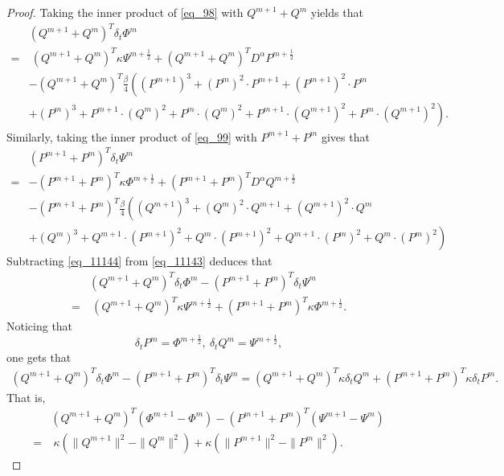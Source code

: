 \documentclass[preprint,compress,3p,10pt,fleqn]{elsarticle}
\numberwithin{equation}{section}
\begin{document}
\begin{proof}
Taking the inner product of \eqref{eq_98} with $Q^{m+1}+Q^{m}$ yields that
\begin{align}
&(Q^{m+1}+Q^{m})^{T}\delta_{t} \varPhi^{m}\nonumber\\
=&~(Q^{m+1}+Q^{m})^{T}\kappa \Psi^{m+\frac{1}{2}}+(Q^{m+1}+Q^{m})^{T}D^{\alpha} P^{m+\frac{1}{2}}\nonumber\\
&-(Q^{m+1}+Q^{m})^{T}\frac{\beta}{4}\left((P^{m+1})^3+(P^{m})^{2}\cdot P^{m+1}+(P^{m+1})^{2}\cdot P^{m}\right.\nonumber\\
&\left.+(P^{m})^{3}+P^{m+1}\cdot (Q^{m})^{2}+P^{m}\cdot (Q^{m})^{2}+P^{m+1}\cdot (Q^{m+1})^{2}+P^{m}\cdot (Q^{m+1})^{2}\right).\label{eq_11143}
\end{align}
Similarly, taking the inner product of \eqref{eq_99} with $P^{m+1}+P^{m}$ gives that
\begin{align}
&(P^{m+1}+P^{m})^{T}\delta_{t} \Psi^{m}\nonumber\\
=&-(P^{m+1}+P^{m})^{T}\kappa \varPhi^{m+\frac{1}{2}}+(P^{m+1}+P^{m})^{T}D^{\alpha} Q^{m+\frac{1}{2}}\nonumber\\
&-(P^{m+1}+P^{m})^{T}\frac{\beta}{4}\left((Q^{m+1})^3+(Q^{m})^{2}\cdot Q^{m+1}+(Q^{m+1})^{2}\cdot Q^{m}\right.\nonumber\\
&\left.+(Q^{m})^{3}+Q^{m+1}\cdot (P^{m+1})^{2}+Q^{m}\cdot (P^{m+1})^{2}+Q^{m+1}\cdot (P^{m})^{2}+Q^{m}\cdot (P^{m})^{2}\right)\label{eq_11144}
\end{align}
Subtracting \eqref{eq_11144} from \eqref{eq_11143} deduces that
\begin{align}
&(Q^{m+1}+Q^{m})^{T}\delta_{t} \varPhi^{m}-(P^{m+1}+P^{m})^{T}\delta_{t} \Psi^{m}\nonumber\\
=&~(Q^{m+1}+Q^{m})^{T}\kappa \Psi^{m+\frac{1}{2}}+(P^{m+1}+P^{m})^{T}\kappa \varPhi^{m+\frac{1}{2}}.\label{eq_11145}
\end{align}
Noticing that
$$\delta_t P^m=\varPhi^{m+\frac{1}{2}},~\delta_t Q^m=\Psi^{m+\frac{1}{2}},$$
one gets that
\begin{align}\label{eq_11146}
(Q^{m+1}+Q^{m})^{T}\delta_{t} \varPhi^{m}\!-\!(P^{m+1}+P^{m})^{T}\delta_{t} \Psi^{m}=(Q^{m+1}+Q^{m})^{T}\kappa \delta_t Q^m+(P^{m+1}+P^{m})^{T}\kappa \delta_t P^m.
\end{align}
That is,
\begin{align}
&(Q^{m+1}+Q^{m})^{T}(\varPhi^{m+1}-\varPhi^{m})-(P^{m+1}+P^{m})^{T}(\Psi^{m+1}-\Psi^{m})\nonumber\\
=&~\kappa (\|Q^{m+1}\|^2-\|Q^{m}\|^2)+\kappa (\|P^{m+1}\|^2-\|P^{m}\|^2).\label{eq_11147}

\end{align}
\end{proof}
\end{document}
